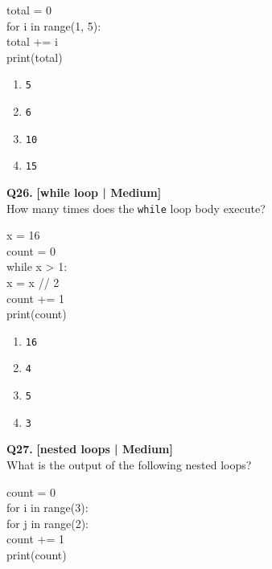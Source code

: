 \begin{pycode}
total = 0\\
for i in range(1, 5):\\
total += i\\
print(total)
\end{pycode}

\begin{enumerate}[label=(\alph*),topsep=2pt,itemsep=1pt,partopsep=0pt,parsep=0pt]
    \item \relax \texttt{5}
    \item \relax \texttt{6}
    \item \relax \texttt{10}
    \item \relax \texttt{15}
\end{enumerate}
\vspace{2mm}

\noindent\textbf{Q26.} \hfill {\small\color{LPUOrange}\textbf{[while loop | Medium]}}\\[2pt]
How many times does the \texttt{while} loop body execute? 

\begin{pycode}
x = 16\\
count = 0\\
while x > 1:\\
x = x // 2\\
count += 1\\
print(count)
\end{pycode}

\begin{enumerate}[label=(\alph*),topsep=2pt,itemsep=1pt,partopsep=0pt,parsep=0pt]
    \item \relax \texttt{16}
    \item \relax \texttt{4}
    \item \relax \texttt{5}
    \item \relax \texttt{3}
\end{enumerate}
\vspace{2mm}

\noindent\textbf{Q27.} \hfill {\small\color{LPUOrange}\textbf{[nested loops | Medium]}}\\[2pt]
What is the output of the following nested loops? 

\begin{pycode}
count = 0\\
for i in range(3):\\
for j in range(2):\\
count += 1\\
print(count)
\end{pycode}

